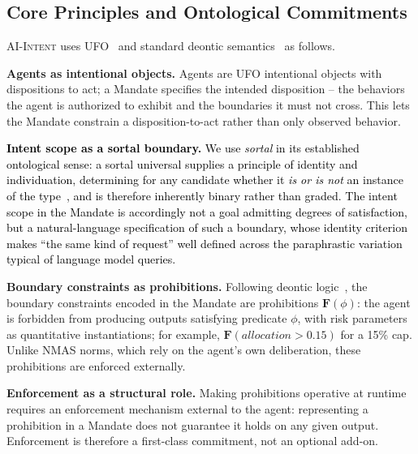 \documentclass[runningheads]{llncs}
\begin{document}
\subsection{Core Principles and Ontological Commitments}
\label{sec:ontology}

\textsc{AI-Intent} uses UFO~\cite{guizzardi2005ontological} and
standard deontic
semantics~\cite{vonwright1951essay,governatori2007characterising} as follows. %

\textbf{Agents as intentional objects.} Agents are UFO intentional objects with dispositions to act; a Mandate specifies the intended disposition -- the behaviors the agent is authorized to exhibit and the boundaries it must not cross. This lets the Mandate constrain a disposition-to-act rather than only observed behavior.

\textcolor{black}{\textbf{Intent scope as a sortal boundary.} We use \emph{sortal} in its
established ontological sense: a sortal universal supplies a principle of identity and individuation, determining for any candidate whether it \emph{is or is not} an instance of the type~\cite{guizzardi2005ontological}, and is therefore inherently binary rather than graded. The intent scope in the Mandate is accordingly not a goal admitting degrees of satisfaction, but a natural-language specification of such a boundary, whose identity criterion makes ``the same kind of request'' well defined across the paraphrastic variation typical of language model queries.}

\textbf{Boundary constraints as prohibitions.} Following deontic logic~\cite{vonwright1951essay}, the boundary constraints encoded in the Mandate are prohibitions $\mathbf{F}(\phi)$: the agent is
forbidden from producing outputs satisfying predicate $\phi$, with risk parameters as quantitative instantiations; for example, $\mathbf{F}(\mathit{allocation} > 0.15)$ for a 15\% cap. Unlike NMAS norms, which rely on the agent's own deliberation, these prohibitions are enforced externally.

\textbf{Enforcement as a structural role.} Making prohibitions operative at runtime requires an enforcement mechanism external to the agent: representing a prohibition in a Mandate does not guarantee it holds on any given output. Enforcement is therefore a first-class commitment, not an optional add-on.
\end{document}
